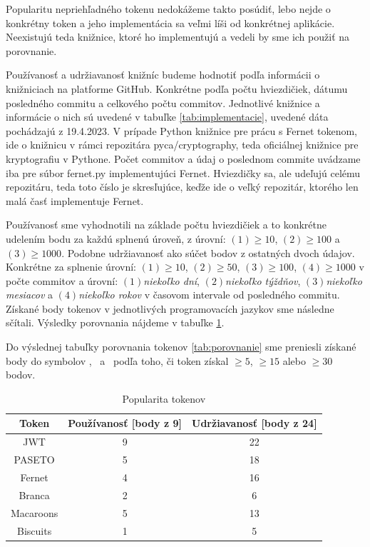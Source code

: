 Popularitu nepriehľadného tokenu nedokážeme takto posúdiť, lebo nejde o konkrétny token a jeho implementácia sa veľmi líši od konkrétnej aplikácie. Neexistujú teda knižnice, ktoré ho implementujú a vedeli by sme ich použiť na porovnanie.

Používanosť a udržiavanosť knižníc budeme hodnotiť podľa informácii o knižniciach na platforme GitHub. Konkrétne podľa počtu hviezdičiek, dátumu posledného commitu a celkového počtu commitov. Jednotlivé knižnice a informácie o nich sú uvedené v tabuľke \ref{tab:implementacie}, uvedené dáta pochádzajú z 19.4.2023. V prípade Python knižnice pre prácu s Fernet tokenom, ide o knižnicu v rámci repozitára pyca/cryptography, teda oficiálnej knižnice pre kryptografiu v Pythone. Počet commitov a údaj o poslednom commite uvádzame iba pre súbor fernet.py implementujúci Fernet. Hviezdičky sa, ale udeľujú celému repozitáru, teda toto číslo je skresľujúce, keďže ide o veľký repozitár, ktorého len malá časť implementuje Fernet. 

Používanosť sme vyhodnotili na základe počtu hviezdičiek a to konkrétne udelením bodu za každú splnenú úroveň, z úrovní: $(1)\ge10$, $(2)\ge100$ a $(3)\ge1000$. Podobne udržiavanosť ako súčet bodov z ostatných dvoch údajov. Konkrétne za splnenie úrovní: $(1)\ge10$, $(2)\ge50$, $(3)\ge100$, $(4)\ge1000$ v počte commitov a úrovní: $(1)$\textit{niekoľko dní}, $(2)$\textit{niekoľko týždňov}, $(3)$\textit{niekoľko mesiacov} a $(4)$\textit{niekoľko rokov} v časovom intervale od posledného commitu. Získané body tokenov v jednotlivých programovacích jazykov sme následne sčítali. Výsledky porovnania nájdeme v tabuľke \ref{tab:popularita}.

Do výslednej tabuľky porovnania tokenov \ref{tab:porovnanie} sme preniesli získané body do symbolov \Circle, \LEFTcircle ~a \CIRCLE ~podľa toho, či token získal $\ge5$, $\ge15$ alebo $\ge30$ bodov.

\begin{table}[H]
  \begin{center}
    \caption{Popularita tokenov}
    \label{tab:popularita} %

    \begin{tabular}{ccc}
      \hline
      Token & Používanosť [body z 9] & Udržiavanosť [body z 24]\\
      \hline
      JWT & 9 & 22 \\
      PASETO & 5 & 18 \\
      Fernet & 4 & 16 \\
      Branca & 2 & 6 \\
      Macaroons & 5 & 13 \\
      Biscuits & 1 & 5 \\
      \hline
    \end{tabular}
  \end{center}
\end{table}